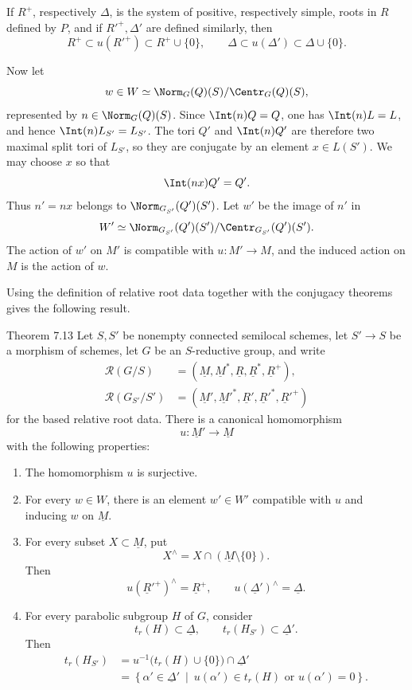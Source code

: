 If \(R^+\), respectively \(\Delta\), is the system of positive,
respectively simple, roots in \(R\) defined by \(P\), and if
\(R'^+,\Delta'\) are defined similarly, then
\[
 R^+\subset u(R'^+)\subset R^+\cup\{0\},
 \qquad
 \Delta\subset u(\Delta')\subset\Delta\cup\{0\}.
\]

Now let
\[
 w\in W\simeq\Norm_G(Q)(S)/\Centr_G(Q)(S),
\]
represented by \(n\in\Norm_G(Q)(S)\).  Since
\(\Int(n)Q=Q\), one has \(\Int(n)L=L\), and hence
\(\Int(n)L_{S'}=L_{S'}\).  The tori \(Q'\) and \(\Int(n)Q'\) are
therefore two maximal split tori of \(L_{S'}\), so they are
conjugate by an element \(x\in L(S')\).  We may choose \(x\) so that
\[
 \Int(nx)Q'=Q'.
\]
Thus \(n'=nx\) belongs to \(\Norm_{G_{S'}}(Q')(S')\).  Let \(w'\)
be the image of \(n'\) in
\[
 W'\simeq
 \Norm_{G_{S'}}(Q')(S')/\Centr_{G_{S'}}(Q')(S').
\]
The action of \(w'\) on \(M'\) is compatible with
\(u:M'\to M\), and the induced action on \(M\) is the action of
\(w\).

Using the definition of relative root data together with the
conjugacy theorems gives the following result.

\begin{sgastatement}{Theorem 7.13}
Let \(S,S'\) be nonempty connected semilocal schemes, let
\(S'\to S\) be a morphism of schemes, let \(G\) be an
\(S\)-reductive group, and write
\[
\begin{aligned}
 \mathcal R(G/S)
  &=(\underline M,\underline M^*,\underline R,
     \underline R^*,\underline R^+),\\
 \mathcal R(G_{S'}/S')
  &=(\underline M',\underline M'^*,\underline R',
     \underline R'^*,\underline R'^+)
\end{aligned}
\]
for the based relative root data.  There is a canonical
homomorphism
\[
 u:\underline M'\longrightarrow\underline M
\]
with the following properties:
\begin{enumerate}[label=\textup{(\roman*)}]
\item The homomorphism \(u\) is surjective.
\item For every \(w\in W\), there is an element \(w'\in W'\)
compatible with \(u\) and inducing \(w\) on \(\underline M\).
\item For every subset \(X\subset\underline M\), put
\[
 X^\wedge=X\cap(\underline M\setminus\{0\}).
\]
Then
\[
 u(\underline R'^+)^\wedge=\underline R^+,
 \qquad
 u(\underline\Delta')^\wedge=\underline\Delta.
\]
\item For every parabolic subgroup \(H\) of \(G\), consider
\[
 t_r(H)\subset\underline\Delta,
 \qquad
 t_r(H_{S'})\subset\underline\Delta'.
\]
Then
\[
\begin{aligned}
 t_r(H_{S'})
 &=u^{-1}\bigl(t_r(H)\cup\{0\}\bigr)
       \cap\underline\Delta'\\
 &=\left\{\alpha'\in\underline\Delta'
       \ \middle|\ 
       u(\alpha')\in t_r(H)\text{ or }u(\alpha')=0
   \right\}.
\end{aligned}
\]
\end{enumerate}
\end{sgastatement}

